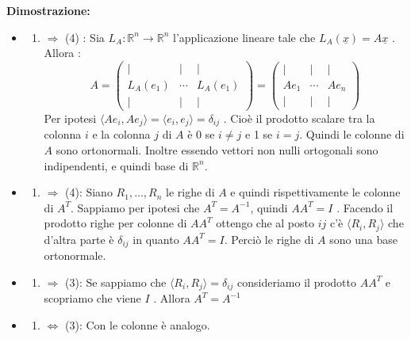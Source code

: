 \documentclass[
  a4paper,
]{article}
\providecommand{\tightlist}{%
  \setlength{\itemsep}{0pt}\setlength{\parskip}{0pt}}
\providecommand{\tightlist}{}
\begin{document}
\textbf{Dimostrazione:}

\begin{itemize}
\item
  \begin{enumerate}
  \def\labelenumi{(\arabic{enumi})}
  \tightlist
  \item
    \(\Rightarrow\) (4) : Sia \(L_A : \mathbb{R}^n \to \mathbb{R}^n\)
    l'applicazione lineare tale che
    \(L_A (\underline{x}) = A\underline{x}\) . Allora : \[
    A = \left(  
    \begin{array}{cccc}  
    \big| & \big| &  \big| \\  
    L_A(e_1) 
    &  
    \cdots  
    &  
    L_A(e_1) \\  
    \big| & \big| & \big|  
    \end{array}  
    \right)
    = \left(  
    \begin{array}{cccc}  
    \big| & \big| &  \big| \\  
    Ae_1
    &  
    \cdots  
    &  
    Ae_n \\  
    \big| & \big| & \big|  
    \end{array}  
    \right)
    \] Per ipotesi
    \(\langle Ae_i, Ae_j \rangle = \langle e_i, e_j \rangle = \delta_{ij}\)
    . Cioè il prodotto scalare tra la colonna \(i\) e la colonna \(j\)
    di \(A\) è \(0\) se \(i \neq j\) e 1 se \(i = j\). Quindi le colonne
    di \(A\) sono ortonormali. Inoltre essendo vettori non nulli
    ortogonali sono indipendenti, e quindi base di \(\mathbb{R}^n\).
  \end{enumerate}
\item
  \begin{enumerate}
  \def\labelenumi{(\arabic{enumi})}
  \setcounter{enumi}{2}
  \tightlist
  \item
    \(\Rightarrow\) (4): Siano \(R_1, \dots, R_n\) le righe di \(A\) e
    quindi rispettivamente le colonne di \(A^T\). Sappiamo per ipotesi
    che \(A^T = A^{-1}\), quindi \(AA^T = I\) . Facendo il prodotto
    righe per colonne di \(AA^T\) ottengo che al posto \(ij\) c'è
    \(\langle R_i, R_j \rangle\) che d'altra parte è \(\delta_{ij}\) in
    quanto \(AA^T = I\). Perciò le righe di \(A\) sono una base
    ortonormale.
  \end{enumerate}
\item
  \begin{enumerate}
  \def\labelenumi{(\arabic{enumi})}
  \setcounter{enumi}{3}
  \tightlist
  \item
    \(\Rightarrow\) (3): Se sappiamo che
    \(\langle R_i, R_j \rangle = \delta_{ij}\) consideriamo il prodotto
    \(AA^T\) e scopriamo che viene \(I\) . Allora \(A^T = A^{-1}\)
  \end{enumerate}
\item
  \begin{enumerate}
  \def\labelenumi{(\arabic{enumi})}
  \setcounter{enumi}{3}
  \tightlist
  \item
    \(\iff\) (3): Con le colonne è analogo.
  \end{enumerate}
\end{itemize}
\end{document}
